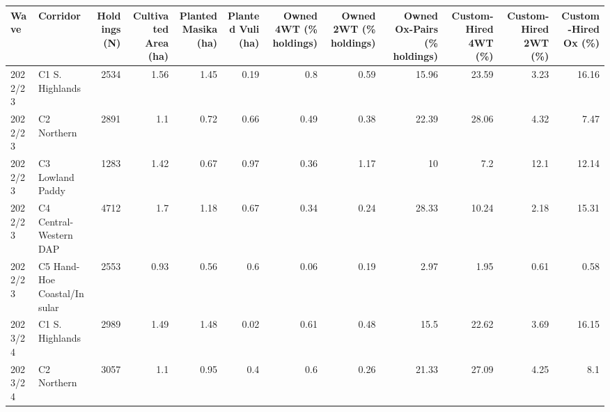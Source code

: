\begin{tabular}{llrrrrrrrrrr}
\toprule
 Wave    & Corridor                    &   Holdings (N) &   Cultivated Area (ha) &   Planted Masika (ha) &   Planted Vuli (ha) &   Owned 4WT (\% holdings) &   Owned 2WT (\% holdings) &   Owned Ox-Pairs (\% holdings) &   Custom-Hired 4WT (\%) &   Custom-Hired 2WT (\%) &   Custom-Hired Ox (\%) \\
\midrule
 2022/23 & C1 S. Highlands             &           2534 &                   1.56 &                  1.45 &                0.19 &                     0.8  &                     0.59 &                         15.96 &                  23.59 &                   3.23 &                 16.16 \\
 2022/23 & C2 Northern                 &           2891 &                   1.1  &                  0.72 &                0.66 &                     0.49 &                     0.38 &                         22.39 &                  28.06 &                   4.32 &                  7.47 \\
 2022/23 & C3 Lowland Paddy            &           1283 &                   1.42 &                  0.67 &                0.97 &                     0.36 &                     1.17 &                         10    &                   7.2  &                  12.1  &                 12.14 \\
 2022/23 & C4 Central-Western DAP      &           4712 &                   1.7  &                  1.18 &                0.67 &                     0.34 &                     0.24 &                         28.33 &                  10.24 &                   2.18 &                 15.31 \\
 2022/23 & C5 Hand-Hoe Coastal/Insular &           2553 &                   0.93 &                  0.56 &                0.6  &                     0.06 &                     0.19 &                          2.97 &                   1.95 &                   0.61 &                  0.58 \\
 2023/24 & C1 S. Highlands             &           2989 &                   1.49 &                  1.48 &                0.02 &                     0.61 &                     0.48 &                         15.5  &                  22.62 &                   3.69 &                 16.15 \\
 2023/24 & C2 Northern                 &           3057 &                   1.1  &                  0.95 &                0.4  &                     0.6  &                     0.26 &                         21.33 &                  27.09 &                   4.25 &                  8.1  \\

\end{tabular}
